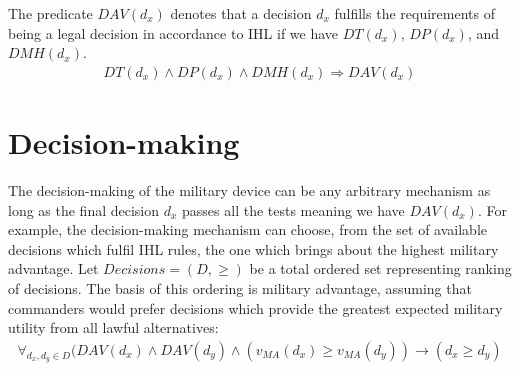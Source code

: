 \begin{ddefinition}
\label{formula:dav}
The predicate $DAV(d_x)$ denotes that a decision $d_x$ fulfills the requirements of being a legal decision in accordance to IHL if we have $DT(d_x)$, $DP(d_x)$, and $DMH(d_x)$.
\begin{align*}
DT(d_x) \wedge DP(d_x) \wedge DMH(d_x) \Rightarrow DAV(d_x)
\end{align*}
\end{ddefinition}


\section{Decision-making}
The decision-making of the military device can be any arbitrary mechanism as long as the final decision $d_x$ passes all the tests meaning we have $DAV(d_x)$.  For example, the decision-making mechanism can choose, from the set of available decisions which fulfil IHL rules, the one which brings about the highest military advantage. 
Let $Decisions = (D, \geq)$ be a total ordered set representing ranking of decisions. The basis of this ordering is military advantage, assuming that commanders would prefer decisions which provide the greatest expected military utility from all lawful alternatives:
\begin{align}
\label{formula:decision}
    \forall_{d_x, d_y \in D}(DAV(d_x) \wedge DAV(d_y) \wedge (v_{MA}(d_x) \geq v_{MA}(d_y)) \rightarrow (d_x \geq d_y)
\end{align}

